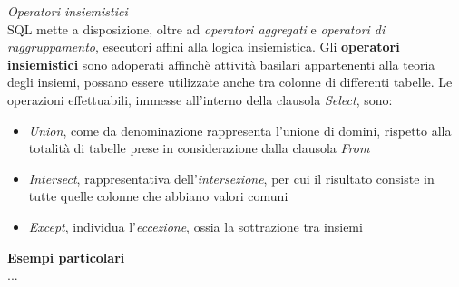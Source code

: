 \documentclass{article}
\begin{document}
\textit{Operatori insiemistici}\\
SQL mette a disposizione, oltre ad \textit{operatori aggregati} e \textit{operatori di raggruppamento}, esecutori affini alla logica insiemistica. Gli \textbf{operatori insiemistici} sono adoperati affinchè attività basilari appartenenti alla teoria degli insiemi, possano essere utilizzate anche tra colonne di differenti tabelle. Le operazioni effettuabili, immesse all'interno della clausola \textit{Select}, sono: 
\begin{itemize}[label={-}]
    \itemsep0em
    \item \textit{Union}, come da denominazione rappresenta l'unione di domini, rispetto alla totalità di tabelle prese in considerazione dalla clausola \textit{From}
    \item \textit{Intersect}, rappresentativa dell'\textit{intersezione}, per cui il risultato consiste in tutte quelle colonne che abbiano valori comuni
    \item \textit{Except}, individua l'\textit{eccezione}, ossia la sottrazione tra insiemi
\end{itemize}
\textbf{Esempi particolari}\\
...
\end{document}
